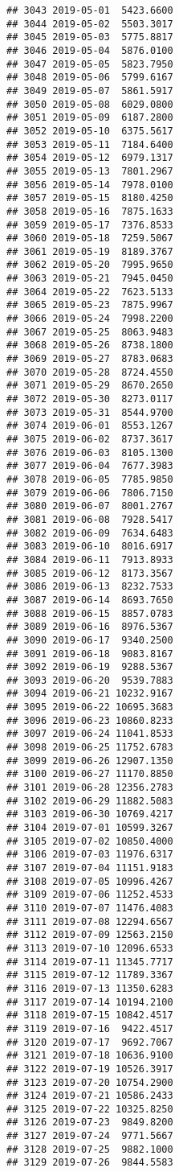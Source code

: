 \documentclass[
]{article}
\begin{document}
\begin{verbatim}
## 3043 2019-05-01  5423.6600
## 3044 2019-05-02  5503.3017
## 3045 2019-05-03  5775.8817
## 3046 2019-05-04  5876.0100
## 3047 2019-05-05  5823.7950
## 3048 2019-05-06  5799.6167
## 3049 2019-05-07  5861.5917
## 3050 2019-05-08  6029.0800
## 3051 2019-05-09  6187.2800
## 3052 2019-05-10  6375.5617
## 3053 2019-05-11  7184.6400
## 3054 2019-05-12  6979.1317
## 3055 2019-05-13  7801.2967
## 3056 2019-05-14  7978.0100
## 3057 2019-05-15  8180.4250
## 3058 2019-05-16  7875.1633
## 3059 2019-05-17  7376.8533
## 3060 2019-05-18  7259.5067
## 3061 2019-05-19  8189.3767
## 3062 2019-05-20  7995.9650
## 3063 2019-05-21  7945.0450
## 3064 2019-05-22  7623.5133
## 3065 2019-05-23  7875.9967
## 3066 2019-05-24  7998.2200
## 3067 2019-05-25  8063.9483
## 3068 2019-05-26  8738.1800
## 3069 2019-05-27  8783.0683
## 3070 2019-05-28  8724.4550
## 3071 2019-05-29  8670.2650
## 3072 2019-05-30  8273.0117
## 3073 2019-05-31  8544.9700
## 3074 2019-06-01  8553.1267
## 3075 2019-06-02  8737.3617
## 3076 2019-06-03  8105.1300
## 3077 2019-06-04  7677.3983
## 3078 2019-06-05  7785.9850
## 3079 2019-06-06  7806.7150
## 3080 2019-06-07  8001.2767
## 3081 2019-06-08  7928.5417
## 3082 2019-06-09  7634.6483
## 3083 2019-06-10  8016.6917
## 3084 2019-06-11  7913.8933
## 3085 2019-06-12  8173.3567
## 3086 2019-06-13  8232.7533
## 3087 2019-06-14  8693.7650
## 3088 2019-06-15  8857.0783
## 3089 2019-06-16  8976.5367
## 3090 2019-06-17  9340.2500
## 3091 2019-06-18  9083.8167
## 3092 2019-06-19  9288.5367
## 3093 2019-06-20  9539.7883
## 3094 2019-06-21 10232.9167
## 3095 2019-06-22 10695.3683
## 3096 2019-06-23 10860.8233
## 3097 2019-06-24 11041.8533
## 3098 2019-06-25 11752.6783
## 3099 2019-06-26 12907.1350
## 3100 2019-06-27 11170.8850
## 3101 2019-06-28 12356.2783
## 3102 2019-06-29 11882.5083
## 3103 2019-06-30 10769.4217
## 3104 2019-07-01 10599.3267
## 3105 2019-07-02 10850.4000
## 3106 2019-07-03 11976.6317
## 3107 2019-07-04 11151.9183
## 3108 2019-07-05 10996.4267
## 3109 2019-07-06 11252.4533
## 3110 2019-07-07 11476.4083
## 3111 2019-07-08 12294.6567
## 3112 2019-07-09 12563.2150
## 3113 2019-07-10 12096.6533
## 3114 2019-07-11 11345.7717
## 3115 2019-07-12 11789.3367
## 3116 2019-07-13 11350.6283
## 3117 2019-07-14 10194.2100
## 3118 2019-07-15 10842.4517
## 3119 2019-07-16  9422.4517
## 3120 2019-07-17  9692.7067
## 3121 2019-07-18 10636.9100
## 3122 2019-07-19 10526.3917
## 3123 2019-07-20 10754.2900
## 3124 2019-07-21 10586.2433
## 3125 2019-07-22 10325.8250
## 3126 2019-07-23  9849.8200
## 3127 2019-07-24  9771.5667
## 3128 2019-07-25  9882.1000
## 3129 2019-07-26  9844.5583

\end{verbatim}
\end{document}
